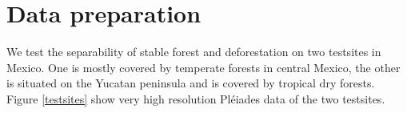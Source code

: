 \documentclass{article}
\begin{document}


\section{Data preparation}
We test the separability of stable forest and deforestation on two testsites in Mexico.
One is mostly covered by temperate forests in central Mexico,
the other is situated on the Yucatan peninsula and is covered by tropical dry forests.
Figure \ref{testsites} show very high resolution Pléiades data of the two testsites.
\end{document}
